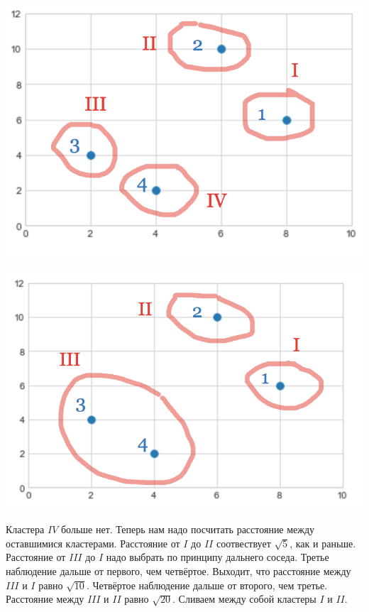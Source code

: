 \documentclass[12pt, a4paper, oneside]{article}
\begin{document}
{\begin{minipage}[t]{0.45\textwidth}
	\includegraphics[scale=0.25]{ekl1.png}
\end{minipage}
\hfill
\begin{minipage}[t]{0.45\textwidth}
	\includegraphics[scale=0.25]{ekl2.png}
\end{minipage}


Кластера $IV$ больше нет. Теперь нам надо посчитать расстояние между оставшимися кластерами. Расстояние от $I$ до $II$ соотвествует $\sqrt{5}$, как и раньше. Расстояние от $III$ до $I$ надо выбрать по принципу дальнего соседа. Третье наблюдение дальше от первого, чем четвёртое. Выходит, что расстояние между $III$ и $I$ равно $\sqrt{10}$. Четвёртое наблюдение дальше от второго, чем третье. Расстояние между $III$ и $II$ равно $\sqrt{20}$. Сливаем между собой кластеры $I$ и $II$. 

}
\end{document}
